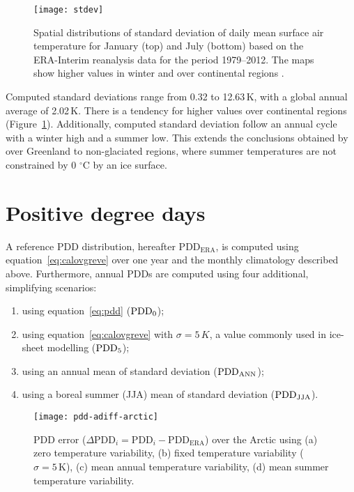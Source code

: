 \documentclass[twocolumn]{igs}
\begin{document}
\begin{figure}
  \centering\texttt{[image: stdev]}
  \caption{Spatial distributions of standard deviation of daily mean surface air temperature for January (top) and July (bottom) based on the ERA-Interim reanalysis data for the period 1979--2012. The maps show higher values in winter and over continental regions \citep{data:erai}.}
  \label{fig:stdev}
\end{figure}

Computed standard deviations range from 0.32 to 12.63\,K, with a global annual average of 2.02\,K. There is a tendency for higher values over continental regions (Figure~\ref{fig:stdev}). Additionally, computed standard deviation follow an annual cycle with a winter high and a summer low. This extends the conclusions obtained by \citet{fausto-etal-2011} over Greenland to non-glaciated regions, where summer temperatures are not constrained by 0 $^\circ$C by an ice surface.


\section{Positive degree days}

A reference PDD distribution, hereafter $\mathrm{PDD_{ERA}}$, is computed using equation~\ref{eq:calovgreve} over one year and the monthly climatology described above. Furthermore, annual PDDs are computed using four additional, simplifying scenarios:

\begin{enumerate}
  \item using equation~\ref{eq:pdd} ($\rm PDD_0$);
  \item using equation~\ref{eq:calovgreve} with $\sigma=5\,K$, a value commonly used in ice-sheet modelling \citep{huybrechts-dewolde-1999,seddik-etal-2012,charbit-etal-2013} ($\rm PDD_5$);
  \item using an annual mean of standard deviation ($\rm PDD_{ANN}$);
  \item using a boreal summer (JJA) mean of standard deviation ($\rm PDD_{JJA}$).
\end{enumerate}

\begin{figure}
  \centering\texttt{[image: pdd-adiff-arctic]}
  \caption{PDD error ($\Delta\mathrm{PDD}_i = \mathrm{PDD}_i - \mathrm{PDD_{ERA}}$) over the Arctic using (a) zero temperature variability, (b) fixed temperature variability ($\sigma=5\,\mathrm{K}$), (c) mean annual temperature variability, (d) mean summer temperature variability.}
  \label{fig:pdd}
\end{figure}
\end{document}
